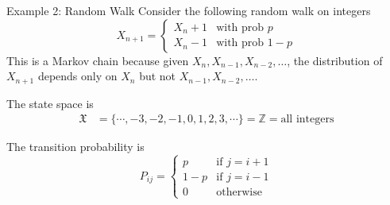 \documentclass[letterpaper,mathserif,handout]{beamer}
\def\P{\mathbb{P}}
\def\X{\mathfrak{X}}
\begin{document}
%
%
%
%
%
\begin{frame}{Example 2: Random Walk}
Consider the following random walk on integers
$$
X_{n+1}=
\begin{cases}
X_n + 1 &\text{with prob } p\\
X_n - 1 &\text{with prob } 1-p
\end{cases}
$$\pause
This is a Markov chain because given $X_n, X_{n-1}, X_{n-2}, \ldots$,
 the distribution of $X_{n+1}$ depends only on $X_n$ but not $X_{n-1}, X_{n-2}, \ldots.$\pause

The state space is
\begin{align*}
\X &= \{\cdots, -3, -2, -1, 0, 1, 2, 3,\cdots\}=\mathbb{Z}=\mbox{all integers}
\end{align*}\pause

The transition probability is
$$
P_{ij}=
\begin{cases}
p   & \mbox{if }j=i+1\\
1-p & \mbox{if }j=i-1\\
0   & \mbox{otherwise}
\end{cases}
$$
\end{frame}
\end{document}
